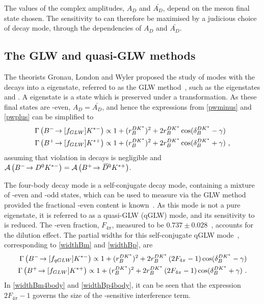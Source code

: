 The values of the complex amplitudes, $A_{D}$ and $\bar{A_{D}}$, depend on the \D meson final state chosen. The sensitivity to \Pgamma can therefore be maximised by a judicious choice of \Dz decay mode, through the dependencies of $A_{D}$ and $\bar{A_{D}}$.

\subsection{The GLW and quasi-GLW methods}
\label{sec:theory:glw}

The theorists Gronau, London and Wyler proposed the study of \decay{\Bm}{\D\Km} modes with the \D decays into a \CP eigenstate, referred to as the GLW method~\cite{GL,GW}, such as the eigenstates \decay{\Dz}{\Kp\Km} and \decay{\Dz}{\pip\pim}. A \CP eigenstate is a state which is preserved under a \CP transformation. As these final states are \CP-even, $A_{D} = \bar{A_{D}}$, and hence the expressions from \eqns\ref{pwminus} and \ref{pwplus} can be simplified to
\begin{align}
\Gamma\left({{{B}^-}}\!\rightarrow [f_{GLW}]{\ensuremath{{K}^{*-}}}\right) &\propto 1 + (r_B^{DK^*})^2 + 2r_B^{DK^*}\cos(\delta_B^{DK^*} - \gamma) \label{widthBm} \\
\Gamma\left({{{B}^+}}\!\rightarrow [f_{GLW}]{\ensuremath{{K}^{*+}}}\right) &\propto 1 + (r_B^{DK^*})^2 + 2r_B^{DK^*}\cos(\delta_B^{DK^*} + \gamma) \text { ,}\label{widthBp}
\end{align}
assuming that \CP violation in \D decays is negligible and $\mathcal{A}\left({{{B}^-}}\!\rightarrow {\ensuremath{{D}^0}}{\ensuremath{{K}^{*-}}}\right) = \mathcal{A}\left({{{B}^+}}\!\rightarrow {\ensuremath{{\kern 0.2em\overline{\kern -0.2em D}{}}{}^0}}{\ensuremath{{K}^{*+}}}\right)$. 

The four-body \D decay mode \decay{\D}{\pip\pim\pip\pim} is a self-conjugate decay mode, containing a mixture of \CP-even and \CP-odd states, which can be used to measure \Pgamma via the GLW method provided the fractional \CP-even content is known~\cite{NAYAK20151}. As this mode is not a pure \CP eigenstate, it is referred to as a quasi-GLW (qGLW) mode, and its sensitivity to \Pgamma is reduced. The \CP-even fraction, $F_{4\pi}$, measured to be $0.737 \pm 0.028$~\cite{charm4pi}, accounts for the dilution effect. The partial widths for this self-conjugate qGLW mode~\cite{NAYAK20151,charm4pi}, corresponding to \eqns\ref{widthBm} and \ref{widthBp}, are
\begin{align}
\Gamma\left({{{B}^-}}\!\rightarrow [f_{qGLW}]{\ensuremath{{K}^{*-}}}\right) \propto 1 + (r_B^{DK^*})^2 + 2r_B^{DK^*}\left(2F_{4\pi} - 1\right)\cos(\delta_B^{DK^*} - \gamma) \label{widthBm4body} \\
\Gamma\left({{{B}^+}}\!\rightarrow [f_{GLW}]{\ensuremath{{K}^{*+}}}\right) \propto 1 + (r_B^{DK^*})^2 + 2r_B^{DK^*}\left(2F_{4\pi} - 1\right)\cos(\delta_B^{DK^*} + \gamma) \text { .} \label{widthBp4body}
\end{align}
In \eqns\ref{widthBm4body} and \ref{widthBp4body}, it can be seen that the expression $2F_{4\pi} - 1$ governs the size of the \Pgamma-sensitive interference term.


